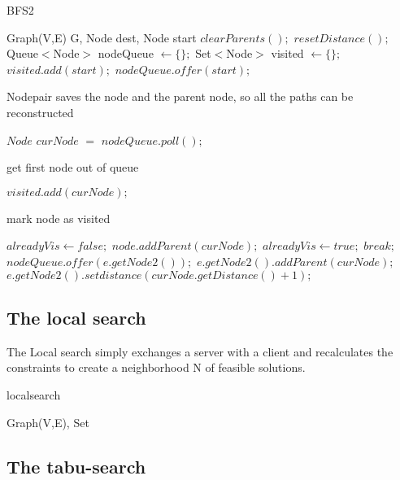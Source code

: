 \documentclass [12pt]{article}
\begin{document}
\begin{algorithm}[H]
  \caption{BFS2}
  \begin{algorithmic}[2]
    \Require Graph(V,E) G, Node dest, Node start
    \State $clearParents();$
    \State $resetDistance();$
    \State Queue$<$Node$>$ nodeQueue $\gets \{\};$
    \State Set$<$Node$>$ visited $\gets \{\};$
    \State $visited.add(start);$
    \State $nodeQueue.offer(start);$ \Comment \begin{itshape} Nodepair saves the node and the parent node,
    so all the paths can be reconstructed\end{itshape}
  \State $Node$ $curNode$ $=$ $nodeQueue.poll();$ \Comment \begin{itshape} get first node out of queue\end{itshape}
  \State $visited.add(curNode);$ \Comment \begin{itshape} mark node as visited\end{itshape}            
    \EndIf
    \State $alreadyVis \gets false;$
    \State $node.addParent(curNode);$
    \State $alreadyVis \gets true;$
    \State $break;$
    \EndFor
    \State $nodeQueue.offer(e.getNode2());$
    \State $e.getNode2().addParent(curNode);$
    \State $e.getNode2().setdistance(curNode.getDistance()+1);$
    \EndIf
    \EndIf
    \EndIf
    \EndFor
    \EndWhile
  \end{algorithmic}
\end{algorithm}

\subsection{The local search}
The Local search simply exchanges a server with a client and recalculates the constraints to create a neighborhood N of feasible solutions.

\begin {algorithm} [H]
\caption {localsearch}
\begin {algorithmic} [3]
\Require Graph(V,E), Set
\end {algorithmic}
\end {algorithm}

\subsection{The tabu-search}
\end{document}
